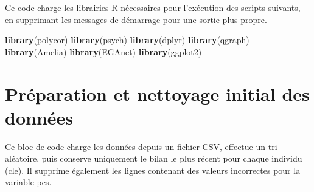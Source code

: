 \documentclass[
]{article}
\newenvironment{Shaded}{\begin{snugshade}}{\end{snugshade}}
\newcommand{\FunctionTok}[1]{\textcolor[rgb]{0.13,0.29,0.53}{\textbf{#1}}}
\newcommand{\NormalTok}[1]{#1}
\begin{document}
Ce code charge les librairies R nécessaires pour l'exécution des scripts
suivants, en supprimant les messages de démarrage pour une sortie plus
propre.

\begin{Shaded}
\begin{Highlighting}[]
\FunctionTok{library}\NormalTok{(polycor)}
\FunctionTok{library}\NormalTok{(psych)}
\FunctionTok{library}\NormalTok{(dplyr)}
\FunctionTok{library}\NormalTok{(qgraph)}
\FunctionTok{library}\NormalTok{(Amelia)}
\FunctionTok{library}\NormalTok{(EGAnet)}
\FunctionTok{library}\NormalTok{(ggplot2)}
\end{Highlighting}
\end{Shaded}

\section{Préparation et nettoyage initial des
données}\label{pruxe9paration-et-nettoyage-initial-des-donnuxe9es}

Ce bloc de code charge les données depuis un fichier CSV, effectue un
tri aléatoire, puis conserve uniquement le bilan le plus récent pour
chaque individu (cle). Il supprime également les lignes contenant des
valeurs incorrectes pour la variable pcs.
\end{document}

